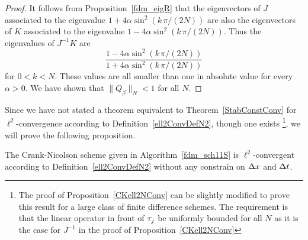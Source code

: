 \begin{proof}
It follows from Proposition~\ref{fdm_eigR} that the eigenvectors
of $J$ associated to the eigenvalue
$\displaystyle 1 + 4 \alpha \sin^2\left(k\,\pi/(2N)\right)$ are
also the eigenvectors of $K$ associated to the eigenvalue
$\displaystyle 1 - 4 \alpha \sin^2\left(k\,\pi/(2N)\right)$.
Thus the eigenvalues of $J^{-1} K$ are
\[
\frac{1 - 4 \alpha \sin^2\left(k\,\pi/(2N)\right)}
{1 + 4 \alpha \sin^2\left(k\,\pi/(2N)\right)}
\]
for $0 < k < N$.  These values are all smaller than one in absolute
value for every $\alpha>0$.  We have shown that $\|Q_\beta\|_N < 1$ for all
$N$.
\end{proof}

Since we have not stated a theorem equivalent to
Theorem~\ref{StabConstConv} for $\ell^2$-convergence
according to Definition~\ref{ell2ConvDefN2}, though one exists
\footnote{The proof of Proposition~\ref{CKell2NConv} can be slightly
modified to prove this result for a large class of finite difference
schemes.  The requirement is that the linear operator in front of
$\mathbf{\tau}_j$ be uniformly bounded for all $N$ as it is the case
for $J^{-1}$ in the proof of Proposition~\ref{CKell2NConv}}, we
will prove the following proposition.

\begin{prop} \label{CKell2NConv}
The Crank-Nicolson scheme given in Algorithm~\ref{fdm_sch11S}
is $\ell^2$-convergent according to Definition~\ref{ell2ConvDefN2}
without any constrain on $\Delta{x}$ and $\Delta{t}$.
\end{prop}

